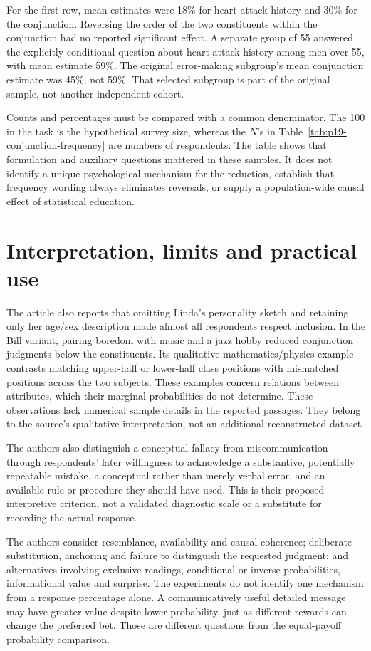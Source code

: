 For the first row, mean estimates were 18\% for heart-attack history
and 30\% for the conjunction. Reversing the order of the two
constituents within the conjunction had no reported significant effect.
A separate group of 55 answered the explicitly conditional question
about heart-attack history among men over 55, with mean estimate
59\%. The original error-making subgroup's mean conjunction estimate
was 45\%, not 59\%. That selected subgroup is part of the original
sample, not another independent cohort.

Counts and percentages must be compared with a common denominator.
The 100 in the task is the hypothetical survey size, whereas the
\(N\)'s in Table~\ref{tab:p19-conjunction-frequency} are numbers
of respondents. The table shows that formulation and auxiliary
questions mattered in these samples. It does not identify a unique
psychological mechanism for the reduction, establish that frequency
wording always eliminates reversals, or supply a population-wide
causal effect of statistical education.

\section{Interpretation, limits and practical use}
\label{sec:p19-conjunction-interpretation}

The article also reports that omitting Linda's personality sketch
and retaining only her age/sex description made almost all respondents
respect inclusion. In the Bill variant, pairing boredom with music
and a jazz hobby reduced conjunction judgments below the constituents.
Its qualitative mathematics/physics example contrasts matching
upper-half or lower-half class positions with mismatched positions
across the two subjects. These examples concern relations between
attributes, which their marginal probabilities do not determine.
These observations lack numerical sample details in the reported passages.
They belong to the source's qualitative interpretation, not an
additional reconstructed dataset.

The authors also distinguish a conceptual fallacy from miscommunication
through respondents' later willingness to acknowledge a substantive,
potentially repeatable mistake, a conceptual rather than merely verbal
error, and an available rule or procedure they should have used.
This is their proposed interpretive criterion, not a validated diagnostic
scale or a substitute for recording the actual response.

The authors consider resemblance, availability and causal coherence;
deliberate substitution, anchoring and failure to distinguish the
requested judgment; and alternatives involving exclusive readings,
conditional or inverse probabilities, informational value and surprise.
The experiments do not identify one mechanism from a response
percentage alone. A communicatively useful detailed message may have
greater value despite lower probability, just as different rewards can
change the preferred bet. Those are different questions from the
equal-payoff probability comparison.

